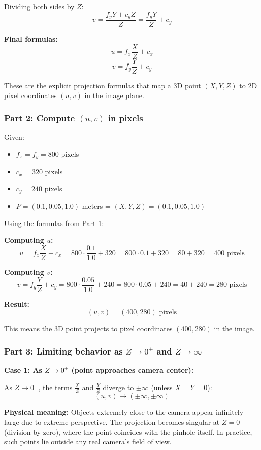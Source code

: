 \documentclass[11pt]{article}
\begin{document}
Dividing both sides by $Z$:
\[
v = \frac{f_y Y + c_y Z}{Z} = \frac{f_y Y}{Z} + c_y
\]

\textbf{Final formulas:}
\[
\boxed{u = f_x \frac{X}{Z} + c_x}
\]
\[
\boxed{v = f_y \frac{Y}{Z} + c_y}
\]

These are the explicit projection formulas that map a 3D point $(X, Y, Z)$ to 2D pixel coordinates $(u, v)$ in the image plane.

\subsubsection*{Part 2: Compute $(u, v)$ in pixels}

Given:
\begin{itemize}
    \item $f_x = f_y = 800$ pixels
    \item $c_x = 320$ pixels
    \item $c_y = 240$ pixels
    \item $P = (0.1, 0.05, 1.0)$ meters = $(X, Y, Z) = (0.1, 0.05, 1.0)$
\end{itemize}

Using the formulas from Part 1:

\textbf{Computing $u$:}
\[
u = f_x \frac{X}{Z} + c_x = 800 \cdot \frac{0.1}{1.0} + 320 = 800 \cdot 0.1 + 320 = 80 + 320 = 400 \text{ pixels}
\]

\textbf{Computing $v$:}
\[
v = f_y \frac{Y}{Z} + c_y = 800 \cdot \frac{0.05}{1.0} + 240 = 800 \cdot 0.05 + 240 = 40 + 240 = 280 \text{ pixels}
\]

\textbf{Result:}
\[
\boxed{(u, v) = (400, 280) \text{ pixels}}
\]

This means the 3D point projects to pixel coordinates $(400, 280)$ in the image.

\subsubsection*{Part 3: Limiting behavior as $Z \to 0^+$ and $Z \to \infty$}

\textbf{Case 1: As $Z \to 0^+$ (point approaches camera center):}

As $Z \to 0^+$, the terms $\frac{X}{Z}$ and $\frac{Y}{Z}$ diverge to $\pm\infty$ (unless $X = Y = 0$):
\[
(u, v) \to (\pm\infty, \pm\infty)
\]

\textbf{Physical meaning:} Objects extremely close to the camera appear infinitely large due to extreme perspective. The projection becomes singular at $Z = 0$ (division by zero), where the point coincides with the pinhole itself. In practice, such points lie outside any real camera's field of view.
\end{document}
